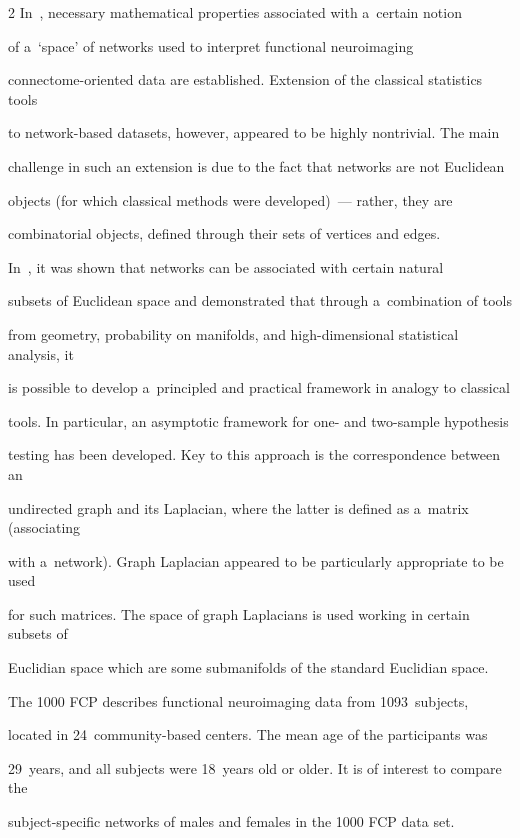 \begin{multicols}{2}
  In~\cite{64-kl}, necessary mathematical properties associated with a~certain notion


of a~`space' of networks used to interpret functional neuroimaging


  connectome-oriented data are established. Extension of the classical statistics tools


to network-based datasets, however, appeared to be highly nontrivial. The main


challenge in such an extension is due to the fact that networks are not Euclidean


objects (for which classical methods were developed)~--- rather, they are


combinatorial objects, defined through their sets of vertices and edges.


  In~\cite{64-kl}, it was shown that networks can be associated with certain natural


subsets of Euclidean space and demonstrated that through a~combination of tools


from geometry, probability on manifolds, and high-dimensional statistical analysis, it


is possible to develop a~principled and practical framework in analogy to classical


tools. In particular, an asymptotic framework for one- and two-sample hypothesis


testing has been developed. Key to this approach is the correspondence between an


undirected graph and its Laplacian, where the latter is defined as a~matrix (associating


with a~network). Graph Laplacian appeared to be particularly appropriate to be used


for such matrices. The space of graph Laplacians is used working in certain subsets of


Euclidian space which are some submanifolds of the standard Euclidian space.





  The 1000 FCP describes functional neuroimaging data from 1093~subjects,


located in 24~community-based centers. The mean age of the participants was


29~years, and all subjects were 18~years old or older. It is of interest to compare the


subject-specific networks of males and females in the 1000 FCP data set.



\end{multicols}
